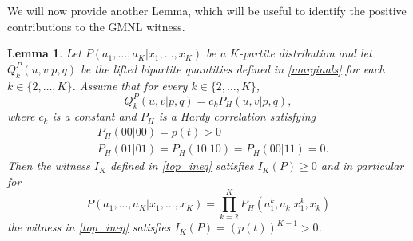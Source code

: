 \documentclass[pra,aps,reprint,superscriptaddress]{revtex4-2}
\theoremstyle{theorem}
\newtheorem{lem}{Lemma}[section]
\begin{document}
We will now provide another Lemma, which will be useful to identify the positive contributions to the GMNL witness.
\begin{lem}\label{lem_B2}Let $P(a_1,\ldots,a_K|x_1,\ldots,x_K)$ be a $K$-partite distribution and let $Q_k^P(u,v|p,q)$ be the lifted bipartite quantities defined in \eqref{marginals} for each $k\in\{2,\ldots,K\}$. Assume that for every $k\in\{2,\ldots,K\}$,
\[
Q_k^P(u,v|p,q)=c_k P_H(u,v|p,q),
\]
where $c_k$ is a constant and $P_H$ is a Hardy correlation satisfying
\begin{align}\nonumber
&P_H(00|00)=p(t)>0\\&P_H(01|01)=P_H(10|10)=P_H(00|11)=0. \label{eq:hardy}
\end{align}
Then the witness $I_K$ defined in \eqref{top_ineq} satisfies $I_K(P)\ge0$ and in particular for 
\begin{equation}\label{this_dist}  P(a_1,...,a_K|x_1,...,x_K)=\prod_{k=2}^KP_H(a_1^k,a_k|x_1^k,x_k)
\end{equation}
the witness in \eqref{top_ineq} satisfies $I_K(P)=(p(t))^{K-1}>0$.
\end{lem}
\end{document}
